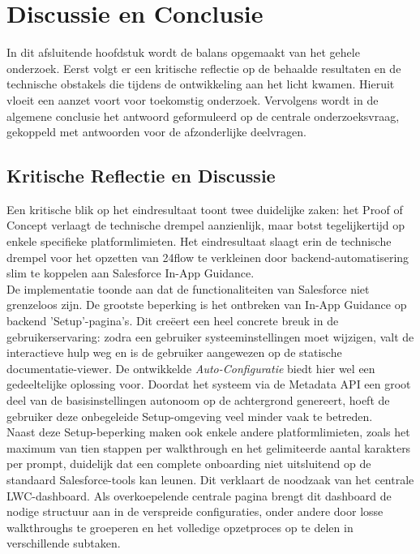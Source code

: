 
\chapter{Discussie en Conclusie}%
\label{ch:discussie-conclusie}

In dit afsluitende hoofdstuk wordt de balans opgemaakt van het gehele onderzoek. Eerst volgt er een kritische reflectie op de behaalde resultaten en de technische obstakels die tijdens de ontwikkeling aan het licht kwamen. Hieruit vloeit een aanzet voort voor toekomstig onderzoek. Vervolgens wordt in de algemene conclusie het antwoord geformuleerd op de centrale onderzoeksvraag, gekoppeld met antwoorden voor de afzonderlijke deelvragen.

\section{Kritische Reflectie en Discussie}%
\label{sec:discussie}
Een kritische blik op het eindresultaat toont twee duidelijke zaken: het Proof of Concept verlaagt de technische drempel aanzienlijk, maar botst tegelijkertijd op enkele specifieke platformlimieten. Het eindresultaat slaagt erin de technische drempel voor het opzetten van 24flow te verkleinen door backend-automatisering slim te koppelen aan Salesforce In-App Guidance.
\\

De implementatie toonde aan dat de functionaliteiten van Salesforce niet grenzeloos zijn. De grootste beperking is het ontbreken van In-App Guidance op backend 'Setup'-pagina's. Dit creëert een heel concrete breuk in de gebruikerservaring: zodra een gebruiker systeeminstellingen moet wijzigen, valt de interactieve hulp weg en is de gebruiker aangewezen op de statische documentatie-viewer. De ontwikkelde \textit{Auto-Configuratie} biedt hier wel een gedeeltelijke oplossing voor. Doordat het systeem via de Metadata API een groot deel van de basisinstellingen autonoom op de achtergrond genereert, hoeft de gebruiker deze onbegeleide Setup-omgeving veel minder vaak te betreden.
\\

Naast deze Setup-beperking maken ook enkele andere platformlimieten, zoals het maximum van tien stappen per walkthrough en het gelimiteerde aantal karakters per prompt, duidelijk dat een complete onboarding niet uitsluitend op de standaard Salesforce-tools kan leunen. Dit verklaart de noodzaak van het centrale LWC-dashboard. Als overkoepelende centrale pagina brengt dit dashboard de nodige structuur aan in de verspreide configuraties, onder andere door losse walkthroughs te groeperen en het volledige opzetproces op te delen in verschillende subtaken. 
\\

